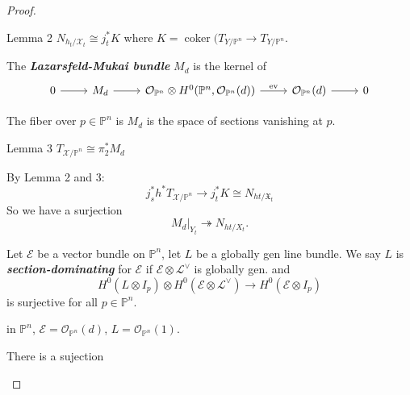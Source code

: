 \begin{proof}
\begin{thing4}{Lemma 2}\leavevmode
	$N_{h_t/\mathcal{X}_t}\cong j^*_t K$ where $K=\operatorname{coker}(T_{Y/\mathbb{P}^n}\to T_{Y/\mathbb{P}^n}$.
\end{thing4}

\begin{defn}\leavevmode
	The \textit{\textbf{Lazarsfeld-Mukai bundle}} $M_d$ is the kernel of
	\[\begin{tikzcd}0\arrow[r]&M_d\arrow[r]&\mathcal{O}_{\mathbb{P}^n}\otimes H^{0}(\mathbb{P}^n , \mathcal{O}_{\mathbb{P}^n}(d))\arrow[r,"\operatorname{ev}"]&\mathcal{O}_{\mathbb{P}^n}(d)\arrow[r]&0\end{tikzcd}\]
\end{defn}

\begin{remark}\leavevmode
	The fiber over $p \in \mathbb{P}^n$ is $M_d$ is the space of sections vanishing at $p$.
\end{remark}

\begin{thing4}{Lemma 3}\leavevmode
	$T_{\mathcal{X}/\mathbb{P}^n}\cong \pi ^*_2M_d$
\end{thing4}

By Lemma 2 and 3:
\[j^*_sh^*  T_{\mathcal{X}/\mathbb{P}^n}\longrightarrow j^* _t K\cong N_{ht/\mathfrak{X}_t}\]
So we have a surjection
\[M_d|_{Y_t}\twoheadrightarrow N_{ht/X_t}.\]

\begin{defn}\leavevmode
	Let $\mathcal{E}$ be a vector bundle on $\mathbb{P}^n$, let $L$ be a globally gen line bundle. We say $L$ is \textit{\textbf{section-dominating}} for $\mathcal{E}$ if $\mathcal{E} \otimes \mathcal{L}^\vee$ is globally gen. and
	\[H^{0}(L \otimes I_p)\otimes H^{0}(\mathcal{E} \otimes \mathcal{L}^\vee)\longrightarrow H^{0}(\mathcal{E} \otimes I_p)\]
	is surjective for all $p \in \mathbb{P}^n$.
\end{defn}

\begin{example}\leavevmode
	in $\mathbb{P}^n$, $\mathcal{E}=\mathcal{O}_{\mathbb{P}^n}(d)$, $L=\mathcal{O}_{\mathbb{P}^n}(1)$.
\end{example}

\begin{prop}\leavevmode
	There is a sujection 
\end{prop}







\end{proof}


